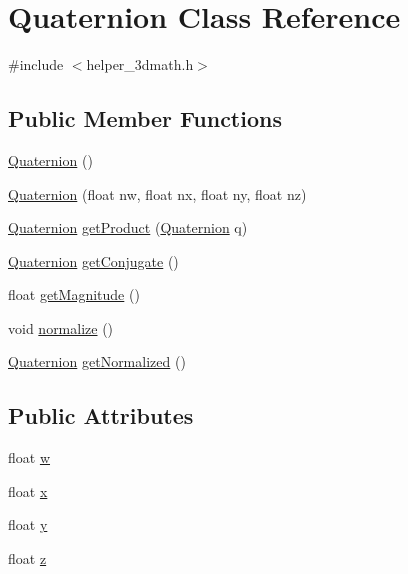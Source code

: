 \hypertarget{classQuaternion}{}\section{Quaternion Class Reference}
\label{classQuaternion}


{\ttfamily \#include $<$helper\+\_\+3dmath.\+h$>$}

\subsection*{Public Member Functions}
\begin{DoxyCompactItemize}
\item 
\mbox{\hyperlink{classQuaternion_abcc01358aada56ea5f0db4da18aaf77d}{Quaternion}} ()
\item 
\mbox{\hyperlink{classQuaternion_ad8158a59767dc3d42ebf0324b82ba95a}{Quaternion}} (float nw, float nx, float ny, float nz)
\item 
\mbox{\hyperlink{classQuaternion}{Quaternion}} \mbox{\hyperlink{classQuaternion_a3ff8405ed92a3ca16de656e6c83b4028}{get\+Product}} (\mbox{\hyperlink{classQuaternion}{Quaternion}} q)
\item 
\mbox{\hyperlink{classQuaternion}{Quaternion}} \mbox{\hyperlink{classQuaternion_a079a5673188a8a7d608e8495de0dd119}{get\+Conjugate}} ()
\item 
float \mbox{\hyperlink{classQuaternion_a6d0f82bd29fcbe29f784e848ec2eb8f1}{get\+Magnitude}} ()
\item 
void \mbox{\hyperlink{classQuaternion_a48e6bafb249c895ed25f29dc9170e11e}{normalize}} ()
\item 
\mbox{\hyperlink{classQuaternion}{Quaternion}} \mbox{\hyperlink{classQuaternion_a61f5f7cb9b248aa259292c3c1960a1f0}{get\+Normalized}} ()
\end{DoxyCompactItemize}
\subsection*{Public Attributes}
\begin{DoxyCompactItemize}
\item 
float \mbox{\hyperlink{classQuaternion_aa44a65ab99e36f6ab8771030eed8a7ad}{w}}
\item 
float \mbox{\hyperlink{classQuaternion_a8b80f191a3155cc0158d2b4f4d50b2cb}{x}}
\item 
float \mbox{\hyperlink{classQuaternion_a3bd3f270462944423611f44e19d2511b}{y}}
\item 
float \mbox{\hyperlink{classQuaternion_a625cb732d8ff3083e7852b86b736ab29}{z}}
\end{DoxyCompactItemize}


